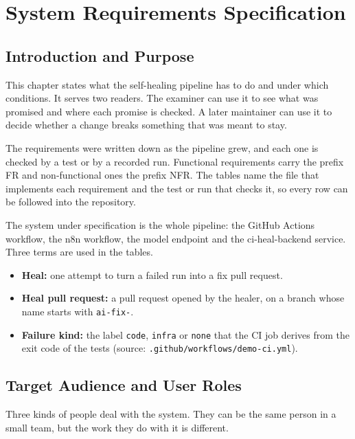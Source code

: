 \chapter{System Requirements Specification}

\section{Introduction and Purpose}

This chapter states what the self-healing pipeline has to do and under which conditions. It serves two readers. The examiner can use it to see what was promised and where each promise is checked. A later maintainer can use it to decide whether a change breaks something that was meant to stay.

The requirements were written down as the pipeline grew, and each one is checked by a test or by a recorded run. Functional requirements carry the prefix FR and non-functional ones the prefix NFR. The tables name the file that implements each requirement and the test or run that checks it, so every row can be followed into the repository.

The system under specification is the whole pipeline: the GitHub Actions workflow, the n8n workflow, the model endpoint and the ci-heal-backend service. Three terms are used in the tables.

\begin{itemize}
  \item \textbf{Heal:} one attempt to turn a failed run into a fix pull request.
  \item \textbf{Heal pull request:} a pull request opened by the healer, on a branch whose name starts with \texttt{ai-fix-}.
  \item \textbf{Failure kind:} the label \texttt{code}, \texttt{infra} or \texttt{none} that the CI job derives from the exit code of the tests (source: \texttt{.github/\allowbreak{}workflows/\allowbreak{}demo-ci.yml}).
\end{itemize}

\section{Target Audience and User Roles}

Three kinds of people deal with the system. They can be the same person in a small team, but the work they do with it is different.

